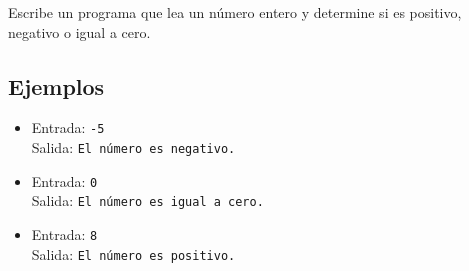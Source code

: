 Escribe un programa que lea un número entero y determine si es positivo, negativo o igual a cero.
\subsection*{Ejemplos}
\begin{itemize}
    \item Entrada: \texttt{-5}\\
          Salida: \texttt{El número es negativo.}
    \item Entrada: \texttt{0}\\
          Salida: \texttt{El número es igual a cero.}
    \item Entrada: \texttt{8}\\
          Salida: \texttt{El número es positivo.}
\end{itemize}